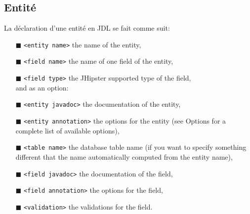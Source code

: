 \subsection{Entité}

La déclaration d'une entité en JDL se fait comme suit:

\begin{Shaded}
\begin{Highlighting}[]
\NormalTok{\}}
\end{Highlighting}
\end{Shaded}

\begin{itemize}
\item[$\blacksquare$]
  \texttt{\textless{}entity\ name\textgreater{}} the name of the entity,
\item[$\blacksquare$]
  \texttt{\textless{}field\ name\textgreater{}} the name of one field of
  the entity,
\item[$\blacksquare$]
  \texttt{\textless{}field\ type\textgreater{}} the JHipster supported
  type of the field,\\
  and as an option:
\item[$\blacksquare$]
  \texttt{\textless{}entity\ javadoc\textgreater{}} the documentation of
  the entity,
\item[$\blacksquare$]
  \texttt{\textless{}entity\ annotation\textgreater{}} the options for
  the entity (see Options for a complete list of available options),
\item[$\blacksquare$]
  \texttt{\textless{}table\ name\textgreater{}} the database table name
  (if you want to specify something different that the name
  automatically computed from the entity name),
\item[$\blacksquare$]
  \texttt{\textless{}field\ javadoc\textgreater{}} the documentation of
  the field,
\item[$\blacksquare$]
  \texttt{\textless{}field\ annotation\textgreater{}} the options for
  the field,
\item[$\blacksquare$]
  \texttt{\textless{}validation\textgreater{}} the validations for the
  field.
\end{itemize}

